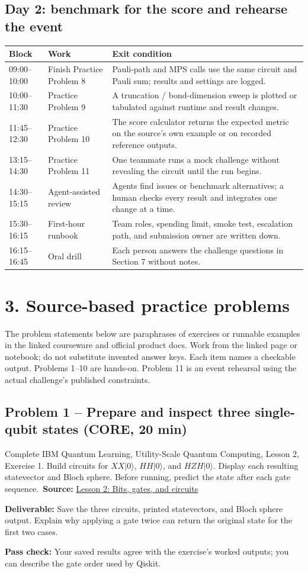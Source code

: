 \documentclass[11pt,letterpaper]{article}
\newcommand{\taskbox}[1]{\vspace{2pt}\noindent\colorbox{pale}{\parbox{\dimexpr\linewidth-2\fboxsep}{\textcolor{ink}{\textbf{Deliverable:} #1}}}\vspace{3pt}}
\newcommand{\pass}[1]{\textbf{Pass check:} #1}
\newcommand{\source}[2]{\textbf{Source:} \href{#1}{#2}}
\begin{document}
\subsection*{Day 2: benchmark for the score and rehearse the event}
\begin{tabularx}{\linewidth}{@{}p{0.91in}p{1.43in}X@{}}
\toprule
\textbf{Block} & \textbf{Work} & \textbf{Exit condition}\\
\midrule
09:00--10:00 & Finish Practice Problem 8 & Pauli-path and MPS calls use the same circuit and Pauli sum; results and settings are logged.\\
10:00--11:30 & Practice Problem 9 & A truncation / bond-dimension sweep is plotted or tabulated against runtime and result changes.\\
11:45--12:30 & Practice Problem 10 & The score calculator returns the expected metric on the source's own example or on recorded reference outputs.\\
13:15--14:30 & Practice Problem 11 & One teammate runs a mock challenge without revealing the circuit until the run begins.\\
14:30--15:15 & Agent-assisted review & Agents find issues or benchmark alternatives; a human checks every result and integrates one change at a time.\\
15:30--16:15 & First-hour runbook & Team roles, spending limit, smoke test, escalation path, and submission owner are written down.\\
16:15--16:45 & Oral drill & Each person answers the challenge questions in Section 7 without notes.\\
\bottomrule
\end{tabularx}

\section*{3. Source-based practice problems}
The problem statements below are paraphrases of exercises or runnable examples in the linked courseware and official product docs. Work from the linked page or notebook; do not substitute invented answer keys. Each item names a checkable output. Problems 1--10 are hands-on. Problem 11 is an event rehearsal using the actual challenge's published constraints.

\subsection*{Problem 1 -- Prepare and inspect three single-qubit states (CORE, 20 min)}
Complete IBM Quantum Learning, Utility-Scale Quantum Computing, Lesson 2, Exercise 1. Build circuits for \(XX|0\rangle\), \(HH|0\rangle\), and \(HZH|0\rangle\). Display each resulting statevector and Bloch sphere. Before running, predict the state after each gate sequence.\
\source{https://learning.quantum.ibm.com/course/utility-scale-quantum-computing/lesson-02-bits-gates-and-circuits}{Lesson 2: Bits, gates, and circuits}
\taskbox{Save the three circuits, printed statevectors, and Bloch sphere output. Explain why applying a gate twice can return the original state for the first two cases.}
\pass{Your saved results agree with the exercise's worked outputs; you can describe the gate order used by Qiskit.}
\end{document}
